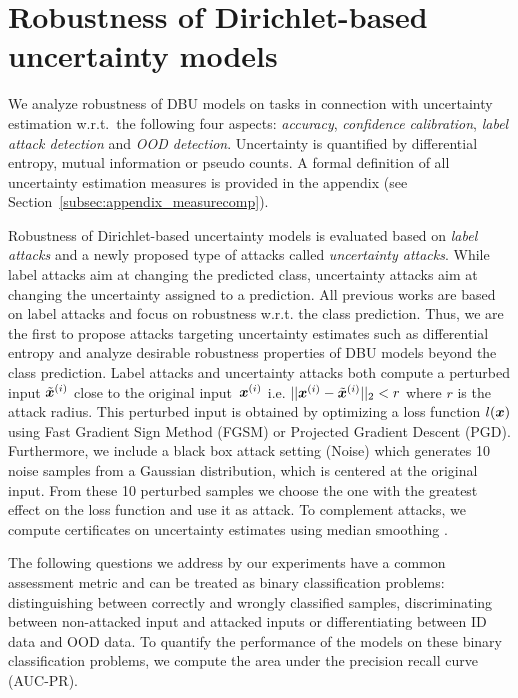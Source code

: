 \section{Robustness of Dirichlet-based uncertainty models}
\label{sec:attack_dirichlet_model_008}

We analyze robustness of DBU models on tasks in connection with uncertainty estimation w.r.t.\ the following four aspects: \emph{accuracy}, \emph{confidence calibration}, \emph{label attack detection} and \emph{OOD detection}. Uncertainty is quantified by differential entropy, mutual information or pseudo counts. 
A formal definition of all uncertainty estimation measures is provided in the appendix (see Section~\ref{subsec:appendix_measurecomp}).  

Robustness of Dirichlet-based uncertainty models is evaluated based on \emph{label attacks} and a newly proposed type of attacks called \emph{uncertainty attacks}. 
While label attacks aim at changing the predicted class, uncertainty attacks aim at changing the uncertainty assigned to a prediction. 
All previous works are based on label attacks and focus on robustness w.r.t. the class prediction. Thus, we are the first to propose attacks targeting uncertainty estimates such as differential entropy and analyze desirable robustness properties of DBU models beyond the class prediction. 
Label attacks and uncertainty attacks both compute a perturbed input $\tilde{{\bm{x}}}^{(i)}$ close to the original input~${\bm{x}}^{(i)}$ i.e. $|| {\bm{x}}^{(i)} - \tilde{{\bm{x}}}^{(i)} ||_2 < r$ where $r$ is the attack radius. This perturbed input is obtained by optimizing a loss function $l({\bm{x}})$ using Fast Gradient Sign Method (FGSM) or Projected Gradient Descent (PGD). Furthermore, we include a black box attack setting (Noise) which generates 10 noise samples from a Gaussian distribution, which is centered at the original input. From these 10 perturbed samples we choose the one with the greatest effect on the loss function and use it as attack. 
To complement attacks, we compute certificates on uncertainty estimates using median smoothing \cite{median_smoothing}. 


The following questions we address by our experiments have a common assessment metric and can be treated as binary classification problems: distinguishing between correctly and wrongly classified samples, discriminating between non-attacked input and attacked inputs or differentiating between ID data and OOD data. To quantify the performance of the models on these binary classification problems, we compute the area under the precision recall curve (AUC-PR).


